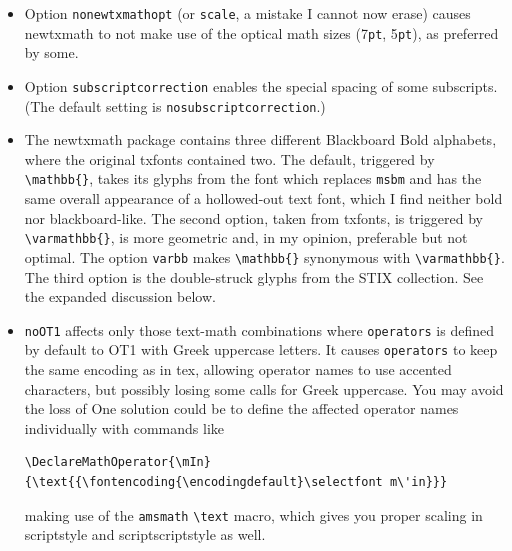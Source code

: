 \documentclass[\fsc]{article}
\theoremstyle{oldplain}
\theoremstyle{plain}
\begin{document}
\begin{itemize}
\item Option {\tt nonewtxmathopt} (or {\tt scale}, a mistake I cannot now erase) causes newtxmath to not make use of the optical math sizes (7{\tt pt}, 5{\tt pt}), as preferred by some.
\item Option {\tt subscriptcorrection} enables the special spacing of some subscripts. (The default setting is {\tt nosubscriptcorrection}.)
\item The \textsf{newtxmath} package contains three different Blackboard Bold alphabets, where the original \textsf{txfonts} contained two. The default, triggered by \verb|\mathbb{}|, takes its glyphs from the font which replaces {\tt msbm} and has the same overall appearance of a hollowed-out text font, which I find neither bold nor blackboard-like. The second option, taken from \textsf{txfonts}, is triggered by \verb|\varmathbb{}|, is more geometric and, in my opinion, preferable but not optimal. The option {\tt varbb} makes \verb|\mathbb{}| synonymous with \verb|\varmathbb{}|. The third option is the double-struck glyphs from the STIX collection. See the expanded discussion below.
\item {\tt noOT1} affects only those text-math combinations where {\tt operators} is defined by default to OT1 with Greek uppercase letters. It causes {\tt operators} to keep the same encoding as in tex, allowing operator names to use accented characters, but possibly losing some calls for Greek uppercase.
You may avoid the loss of One solution could be to define the affected operator names individually with commands like
\begin{verbatim}
\DeclareMathOperator{\mIn}{\text{{\fontencoding{\encodingdefault}\selectfont m\'in}}}
\end{verbatim}
making use of  the {\tt amsmath} \verb|\text| macro, which gives you proper scaling in scriptstyle and scriptscriptstyle as well.


\end{itemize}
\end{document}
